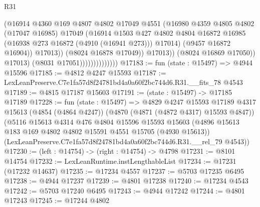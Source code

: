 \begin{lexlean}{R31}
\begin{coremodule}
                                          (@16914
                                            @4360
                                            @169
                                            @4807
                                            @4802
                                            @17049
                                            @4551
                                            (@16980
                                              @4359
                                              @4805
                                              @4802
                                              (@17047 @16985)
                                              @17049
                                              (@16914
                                                @1503
                                                @427
                                                @4802
                                                @4804
                                                @16872
                                                @16985
                                                (@16938 @273 @16872 (@4910 (@16941 @273)))
                                                @17014)
                                              (@9457 @16872 @16904))
                                            @17013))
                                        (@8024 @16878 @17049))
                                      @17013))
                                  (@8024 @16869 @17050))
                                @17013)
                              (@8031 @17051))))))))))))))
@17183 := fun (state : @15497) => @4944 @15596
@17185 := @4812 @4247 @15593
@17187 := LexLeanPreserve.C7e1fa57d8f24781bd4a0a60f2bc744d6.R31.__fits_78 @4543
@17189 := @4815 @17187 @15603
@17191 := (state : @15497) -> @17185 @17189
@17228 := fun (state : @15497) =>
  @4829
    @4247
    @15593
    @17189
    @4317
    @15613
    (@4854 (@4864 @4247))
    (@4870 (@4871 (@4872 @4317) @15593 @4847))
    (@5116
      @15613
      @4314
      @476
      @4804
      @15596
      @15593
      @15603
      (@4896 @15613 @183 @169 @4802 @4802 @15591 @4551 @15705 (@4930 @15613))
      (LexLeanPreserve.C7e1fa57d8f24781bd4a0a60f2bc744d6.R31.__rel_79 @4543))
@17230 := (left : @14754) -> (right : @14754) -> @4798
@17231 := @8101 @14754
@17232 := LexLeanRuntime.instLengthableList
@17234 := @17231 (@17232 @14637)
@17235 := @17234 @4557
@17237 := @5703 @17235 @6495
@17238 := @4944 @17237
@17239 := @4801 @17238
@17240 := @17234 @4543
@17242 := @5703 @17240 @6495
@17243 := @4944 @17242
@17244 := @4801 @17243
@17245 := @17244 @4802

\end{coremodule}
\end{lexlean}
